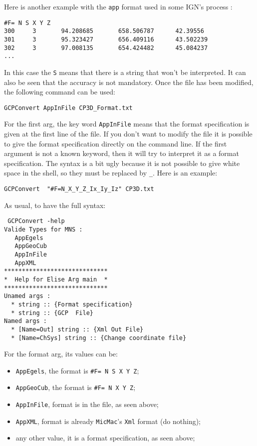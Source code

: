 Here is another example with the {\tt app} format used in some IGN's process :

\begin{verbatim}
#F= N S X Y Z
300     3       94.208685       658.506787      42.39556
301     3       95.323427       656.409116      43.502239
302     3       97.008135       654.424482      45.084237
...
\end{verbatim}

In this case  the {\tt S} means that there is a string that won't be interpreted. It can
also be seen that the accuracy is not mandatory.
Once the file has been modified, the following command can be used:

\begin{verbatim}
GCPConvert AppInFile CP3D_Format.txt
\end{verbatim}

For the first arg, the key word {\tt AppInFile} means that the format specification is given
at the first line of the file. If you don't want to modify the file it is possible to  
give the format specification directly on the command line. If the first argument is not
a known keyword, then it will try to interpret it as a format specification. The syntax
is a bit ugly because it is not possible to give white space in the shell, so they must
be replaced by {\tt \_}. Here is an example:

\begin{verbatim}
GCPConvert  "#F=N_X_Y_Z_Ix_Iy_Iz" CP3D.txt
\end{verbatim}

As usual, to have the full syntax:

\begin{verbatim}
 GCPConvert -help
Valide Types for MNS : 
   AppEgels
   AppGeoCub
   AppInFile
   AppXML
*****************************
*  Help for Elise Arg main  *
*****************************
Unamed args : 
  * string :: {Format specification}
  * string :: {GCP  File}
Named args : 
  * [Name=Out] string :: {Xml Out File}
  * [Name=ChSys] string :: {Change coordinate file}
\end{verbatim}


For the format arg, its values can be:

\begin{itemize}
   \item  {\tt AppEgels}, the format  is {\tt \#F= N S X Y Z};
   \item  {\tt AppGeoCub}, the format  is {\tt \#F= N X Y Z};
   \item  {\tt AppInFile}, format is in the file, as seen above;
   \item  {\tt AppXML}, format is already {\tt MicMac}'s {\tt Xml} format (do nothing);
   \item  any other value, it is a format specification, as seen above;
\end{itemize}

